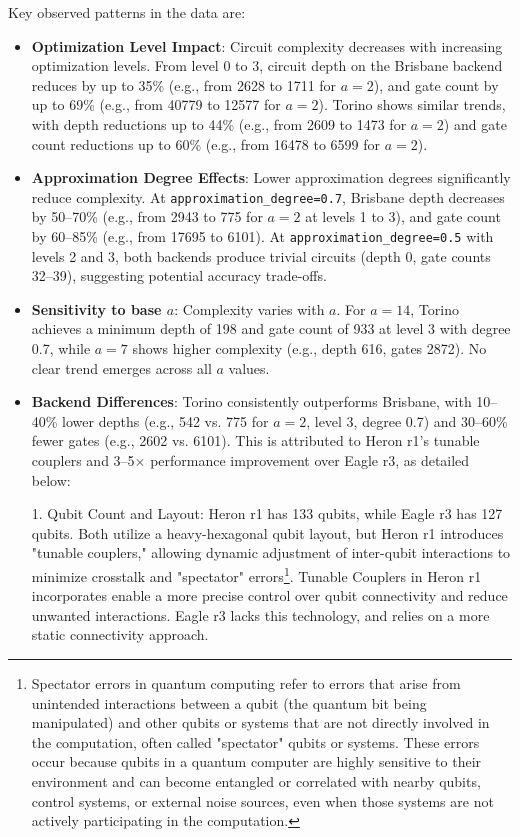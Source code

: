 \documentclass[conference,twoside]{IEEEtran}
\begin{document}
Key observed patterns in the data are:
\begin{itemize}
    \item \textbf{Optimization Level Impact}: Circuit complexity decreases with increasing optimization levels. From level 0 to 3, circuit depth on the Brisbane backend reduces by up to 35\% (e.g., from 2628 to 1711 for $a=2$), and gate count by up to 69\% (e.g., from 40779 to 12577 for $a=2$). Torino shows similar trends, with depth reductions up to 44\% (e.g., from 2609 to 1473 for $a=2$) and gate count reductions up to 60\% (e.g., from 16478 to 6599 for $a=2$).
    \item \textbf{Approximation Degree Effects}: Lower approximation degrees significantly reduce complexity. At \texttt{approximation\_degree=0.7}, Brisbane depth decreases by 50--70\% (e.g., from 2943 to 775 for $a=2$ at levels 1 to 3), and gate count by 60--85\% (e.g., from 17695 to 6101). At \texttt{approximation\_degree=0.5} with levels 2 and 3, both backends produce trivial circuits (depth 0, gate counts 32–39), suggesting potential accuracy trade-offs.
    \item \textbf{Sensitivity to base $a$}: Complexity varies with $a$. For $a=14$, Torino achieves a minimum depth of 198 and gate count of 933 at level 3 with degree 0.7, while $a=7$ shows higher complexity (e.g., depth 616, gates 2872). No clear trend emerges across all $a$ values.
    \item \textbf{Backend Differences}: Torino consistently outperforms Brisbane, with 10--40\% lower depths (e.g., 542 vs. 775 for $a=2$, level 3, degree 0.7) and 30--60\% fewer gates (e.g., 2602 vs. 6101). This is attributed to Heron r1's tunable couplers and 3–5$\times$ performance improvement over Eagle r3, as detailed below:

1. Qubit Count and Layout: Heron r1 has 133 qubits, while Eagle r3 has 127 qubits. Both utilize a heavy-hexagonal qubit layout, but Heron r1 introduces "tunable couplers," allowing dynamic adjustment of inter-qubit interactions to minimize crosstalk and "spectator" errors\footnote{Spectator errors in quantum computing refer to errors that arise from unintended interactions between a qubit (the quantum bit being manipulated) and other qubits or systems that are not directly involved in the computation, often called "spectator" qubits or systems. These errors occur because qubits in a quantum computer are highly sensitive to their environment and can become entangled or correlated with nearby qubits, control systems, or external noise sources, even when those systems are not actively participating in the computation.}. Tunable Couplers in Heron r1 incorporates enable a more precise control over qubit connectivity and reduce unwanted interactions. Eagle r3 lacks this technology, and relies on a more static connectivity approach.


\end{itemize}
\end{document}
